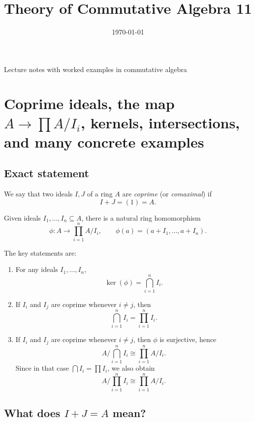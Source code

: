 \documentclass[12pt,a4paper]{article}
\title{\vspace{-1.5em}\bfseries Theory of Commutative Algebra 11}
\author{}
\date{\today}
\theoremstyle{notespace}
\begin{document}
	\maketitle
	\thispagestyle{plain}
		\begin{center}
		\begin{minipage}{0.92\textwidth}
			Lecture notes with worked examples in commutative algebra
		\end{minipage}
	\end{center}
		\tableofcontents
	\clearpage

\section{Coprime ideals, the map \(A\to \prod A/I_i\), kernels, intersections, and many concrete examples}

\subsection{Exact statement}

We say that two ideals \(I,J\) of a ring \(A\) are \emph{coprime} (or \emph{comaximal}) if
\[
I+J=(1)=A.
\]

Given ideals \(I_1,\dots,I_n\subseteq A\), there is a natural ring homomorphism
\[
\phi:A\longrightarrow \prod_{i=1}^n A/I_i,
\qquad
\phi(a)=(a+I_1,\dots,a+I_n).
\]

The key statements are:

\begin{enumerate}
	\item For any ideals \(I_1,\dots,I_n\),
	\[
	\ker(\phi)=\bigcap_{i=1}^n I_i.
	\]
	
	\item If \(I_i\) and \(I_j\) are coprime whenever \(i\neq j\), then
	\[
	\bigcap_{i=1}^n I_i=\prod_{i=1}^n I_i.
	\]
	
	\item If \(I_i\) and \(I_j\) are coprime whenever \(i\neq j\), then \(\phi\) is surjective, hence
	\[
	A\Big/\bigcap_{i=1}^n I_i \cong \prod_{i=1}^n A/I_i.
	\]
	Since in that case \(\bigcap I_i=\prod I_i\), we also obtain
	\[
	A\Big/\prod_{i=1}^n I_i \cong \prod_{i=1}^n A/I_i.
	\]
\end{enumerate}

\subsection{What does \(I+J=A\) mean?}
\end{document}
